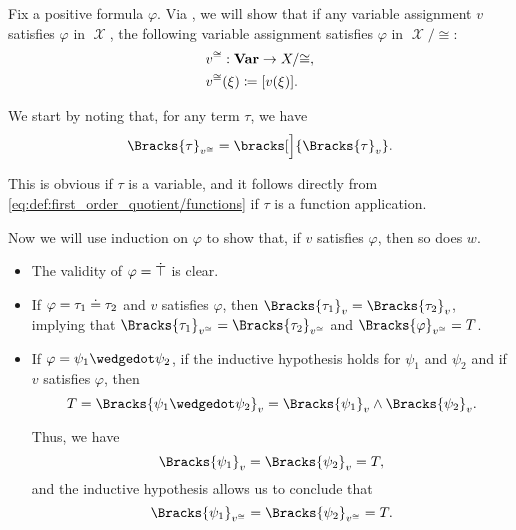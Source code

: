 \begin{defproof}
  Fix a positive formula \( \varphi \). Via , we will show that if any variable assignment \( v \) satisfies \( \varphi \) in \( \mscrX \), the following variable assignment satisfies \( \varphi \) in \( \mscrX / {\cong} \):
  \begin{equation*}
    \begin{aligned}
      &v^{\cong}: \operatorname{\mathbf{Var}} \to X / {\cong}, \\
      &v^{\cong}(\xi) \coloneqq [v(\xi)].
    \end{aligned}
  \end{equation*}

  We start by noting that, for any term \( \tau \), we have
  \begin{equation}\label{eq:thm:quotient_preserves_positive_formulas/term_equality}
    \Bracks{\tau}_{v^{\cong}} = \bracks[\Big]{ \Bracks{\tau}_v }.
  \end{equation}

  This is obvious if \( \tau \) is a variable, and it follows directly from \eqref{eq:def:first_order_quotient/functions} if \( \tau \) is a function application.

  Now we will use induction on \( \varphi \) to show that, if \( v \) satisfies \( \varphi \), then so does \( w \).
  \begin{itemize}
    \item The validity of \( \varphi = \dot\top \) is clear.
    \item If \( \varphi = \tau_1 \doteq \tau_2 \) and \( v \) satisfies \( \varphi \), then \( \Bracks{\tau_1}_v = \Bracks{\tau_2}_v \), implying that \( \Bracks{\tau_1}_{v^{\cong}} = \Bracks{\tau_2}_{v^{\cong}} \) and \( \Bracks{\varphi}_{v^{\cong}} = T \).

    \item If \( \varphi = \psi_1 \synwedge \psi_2 \), if the inductive hypothesis holds for \( \psi_1 \) and \( \psi_2 \) and if \( v \) satisfies \( \varphi \), then
    \begin{equation*}
      T
      =
      \Bracks{\psi_1 \synwedge \psi_2}_v
      =
      \Bracks{\psi_1}_v \wedge \Bracks{\psi_2}_v.
    \end{equation*}

    Thus, we have
    \begin{equation*}
      \Bracks{\psi_1}_v = \Bracks{\psi_2}_v = T,
    \end{equation*}
    and the inductive hypothesis allows us to conclude that
    \begin{equation*}
      \Bracks{\psi_1}_{v^{\cong}} = \Bracks{\psi_2}_{v^{\cong}} = T.
    \end{equation*}


\end{itemize}
\end{defproof}
